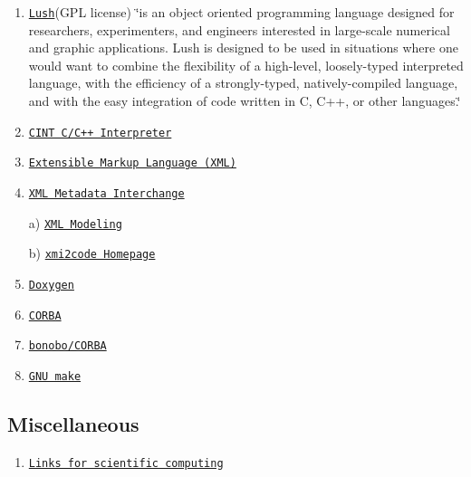 \begin{enumerate}
\item \href{http://lush.sourceforge.net/}{\tt Lush}(GPL license) \char`\"{}is an object oriented programming language designed for researchers, experimenters, and engineers interested in large-scale numerical and graphic applications. Lush is designed to be used in situations where one would want to combine the flexibility of a high-level, loosely-typed interpreted language, with the efficiency of a strongly-typed, natively-compiled language, and with the easy integration of code written in C, C++, or other languages.\char`\"{}\item \href{http://root.cern.ch/root/Cint.html}{\tt CINT C/C++ Interpreter}\item \href{http://www.w3.org/XML/}{\tt Extensible Markup Language (XML)}\item \href{http://www.omg.org/technology/documents/formal/xmi.htm}{\tt XML Metadata Interchange}\par
 a) \href{http://xmlmodeling.com/}{\tt XML Modeling}\par
 b) \href{http://xmi2code.sourceforge.net/}{\tt xmi2code Homepage}\item \href{http://www.doxygen.org/}{\tt Doxygen}\item \href{http://www.corba.org/}{\tt CORBA}\item \href{http://www.gnome.org/gnome-office/bonobo.shtml}{\tt bonobo/CORBA}\item \href{http://george.ee.washington.edu/prog_docs/make/make.html#SEC68}{\tt GNU make}\end{enumerate}
\hypertarget{developments_miscLinks}{}\subsection{Miscellaneous}\label{developments_miscLinks}
\begin{enumerate}
\item \href{http://www.math.tu-cottbus.de/INSTITUT/lsnmwr/wr-links.html}{\tt Links for scientific computing} \end{enumerate}
